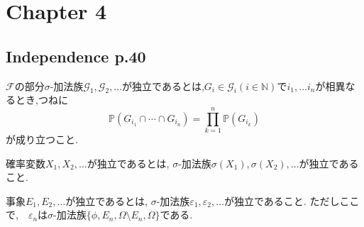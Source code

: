 \section{Chapter 4}
\subsection{Independence p.40}
 
\begin{def*}
$\mathcal{F}$の部分$\sigma$-加法族$\mathcal{G}_{1}, \mathcal{G}_{2}, \ldots$が独立であるとは,$G_{i}\in \mathcal{G}_{i}(i\in \mathbb{N})$で$i_{1}, \ldots i_{n}$が相異なるとき,つねに
$$
\mathbb{P}\left(G_{i_{1}}\cap \cdots \cap G_{i_{n}}\right)
=\prod_{k=1}^{n}\mathbb{P}\left(G_{i_{k}}\right)
$$
が成り立つこと.
\end{def*}

\begin{def*}
 確率変数$X_{1}, X_{2}, \ldots$が独立であるとは, $\sigma$-加法族$\sigma(X_{1}), \sigma(X_{2}), \ldots$が独立であること.
\end{def*}

\begin{def*}
事象$E_{1}, E_{2}, \ldots$が独立であるとは, $\sigma$-加法族$\varepsilon_{1}, \varepsilon_{2}, \ldots$が独立であること.
ただしここで,　$\varepsilon_{n}$は$\sigma$-加法族$\{\phi, E_n, \Omega \setminus E_{n}, \Omega\}$である.
\end{def*}
 
\begin{lem*}

\end{lem*}
